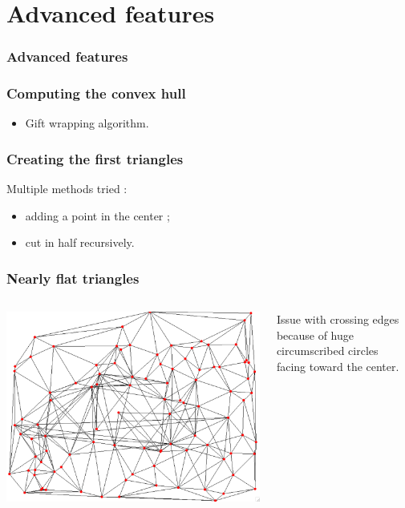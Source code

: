 \documentclass{beamer}
\begin{document}
	
	\section{Advanced features}
	\begin{frame}
		\frametitle{Advanced features}
		\tableofcontents[currentsection]
	\end{frame}
	
	\begin{frame}
		\frametitle{Computing the convex hull}
		\begin{itemize}
			\item Gift wrapping algorithm.
		\end{itemize}
	\end{frame}
	
	\begin{frame}
		\frametitle{Creating the first triangles}
		Multiple methods tried :
		\begin{itemize}
			\item adding a point in the center ;
			\item cut in half recursively.
		\end{itemize}
	\end{frame}
	
	\begin{frame}
		\frametitle{Nearly flat triangles}
		\begin{columns}[T]
			\begin{column}{.5\textwidth}
				\hspace*{0cm} \includegraphics[height=0.5\textheight]{convexhull-messedup-abit.png} \hspace*{\fill}
			\end{column}
			\begin{column}{.45\textwidth}
				Issue with crossing edges because of huge circumscribed circles facing toward the center.
			\end{column}
		\end{columns}
	\end{frame}
\end{document}
